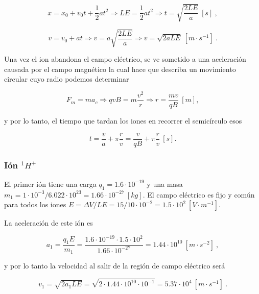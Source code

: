 \documentclass[journal]{IEEEtran}
\begin{document}
\begin{equation}
x = x_0 + v_0t + \displaystyle\frac{1}{2}at^2 \Rightarrow LE = \displaystyle\frac{1}{2}at^2 \Rightarrow t = \sqrt{\displaystyle\frac{2LE}{a}}~[s]~,
\end{equation}

\begin{equation}
v = v_0 + at \Rightarrow v = a\sqrt{\displaystyle\frac{2LE}{a}} \Rightarrow v = \sqrt{2aLE}~[m\cdot s^{-1}]~.
\end{equation}

Una vez el ion abandona el campo eléctrico, se ve sometido a una aceleración causada por el campo magnético la cual hace que describa un movimiento circular cuyo radio podemos determinar

\begin{equation}
F_m = ma_c \Rightarrow qvB = m \displaystyle\frac{v^2}{r} \Rightarrow r = \displaystyle\frac{mv}{qB}~[m],
\end{equation}

y por lo tanto, el tiempo que tardan los iones en recorrer el semicírculo esos

\begin{equation}
t = \displaystyle\frac{v}{a} + \pi \displaystyle\frac{r}{v} = \displaystyle\frac{v}{qB} + \pi \displaystyle\frac{r}{v}~[s].
\end{equation}

\subsubsection{Ión $^1H^+$}

El primer ión tiene una carga $q_1 = 1.6\cdot 10^{-19}$ y una masa $m_1 = 1\cdot 10^{-3} / 6.022\cdot 10^{23} = 1.66\cdot 10^{-27}~[kg]$. El campo eléctrico es fijo y común para todos los iones $E = \Delta V / LE = 15 / 10\cdot 10^{-2} = 1.5\cdot 10^2~[V\cdot m^{-1}]$.

La aceleración de este ión es

\begin{equation}
a_1 = \displaystyle\frac{q_1E}{m_1} = \displaystyle\frac{1.6\cdot 10^{-19}\cdot 1.5\cdot 10^{2}}{1.66\cdot 10^{-27}} = 1.44 \cdot 10^{10}~[m\cdot s^{-2}]~,
\end{equation}

y por lo tanto la velocidad al salir de la región de campo eléctrico será

\begin{equation}
    v_1 = \sqrt{2a_1LE} = \sqrt{2\cdot 1.44\cdot 10^{10} \cdot 10^{-1}} = 5.37 \cdot 10^4~[m\cdot s^{-1}]~.
\end{equation}
\end{document}
